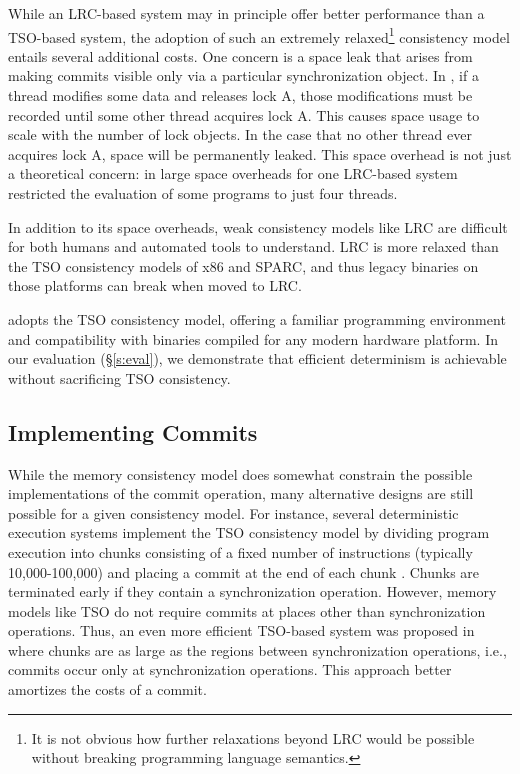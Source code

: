 While an LRC-based system may in principle offer better performance than a TSO-based system, the adoption of such an extremely relaxed\footnote{It is not obvious how further relaxations beyond LRC would be possible without breaking programming language semantics.} consistency model entails several additional costs. One concern is a space leak that arises from making commits visible only via a particular synchronization object. In \cite{kai_lu_efficient_2014}, if a thread modifies some data and releases lock A, those modifications must be recorded until some other thread acquires lock A. This causes space usage to scale with the number of lock objects. In the case that no other thread ever acquires lock A, space will be permanently leaked. This space overhead is not just a theoretical concern: in \cite{kai_lu_efficient_2014} large space overheads for one LRC-based system restricted the evaluation of some programs to just four threads.


 In addition to its space overheads, weak consistency models like LRC are difficult for both humans \cite{adve_data_2010} and automated tools \cite{batty_mathematizing_2011,burckhardt_checkfence:_2007} to understand. LRC is more relaxed than the TSO consistency models of x86 and SPARC, and thus legacy binaries on those platforms can break when moved to LRC.

\lib{} adopts the TSO consistency model, offering a familiar programming environment and compatibility with binaries compiled for any modern hardware platform. In our evaluation (\S\ref{s:eval}), we demonstrate that efficient determinism is achievable without sacrificing TSO consistency. 

\subsection{Implementing Commits}
\label{s:commit}

While the memory consistency model does somewhat constrain the possible implementations of the commit operation, many alternative designs are still possible for a given consistency model. For instance, several deterministic execution systems implement the TSO consistency model by dividing program execution into chunks consisting of a fixed number of instructions (typically 10,000-100,000) and placing a commit at the end of each chunk \cite{bergan_coredet:_2010,derek_r._hower_calvin:_2011}. Chunks are terminated early if they contain a synchronization operation. However, memory models like TSO do not require commits at places other than synchronization operations. Thus, an even more efficient TSO-based system was proposed in \cite{liu_dthreads:_2011} where chunks are as large as the regions between synchronization operations, i.e., 
commits occur only at synchronization operations. This approach better amortizes the costs of a commit.

